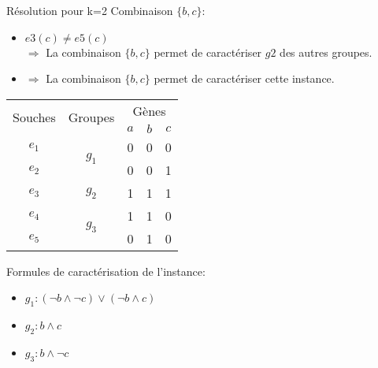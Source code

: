 \begin{overprint}
{			\hspace{0.6cm}
			\begin{minipage}[r]{0.46\linewidth}
				\begin{block}{Résolution pour k=2}
					Combinaison $\{b,c\}$:
					\begin{itemize}
						\item $e3(c) \not = e5(c) $ \\ $\Rightarrow$ La combinaison $\{b,c\}$ permet de caractériser $g2$ des autres groupes.
						\item<31> $\Rightarrow$ La combinaison $\{b,c\}$ permet de caractériser cette instance.
					\end{itemize}
				\end{block}
			\end{minipage}
		}
		{
			\begin{minipage}[l]{0.46\linewidth}
				\begin{center}
					\begin{tabular}{|c||c|c|c|c|}
						\hline
						\multirow{2}{*}{Souches}&\multirow{2}{*}{Groupes}&\multicolumn{3}{c|}{Gènes
						}\\
						&&$a$&$b$&$c$\\
						\hline
						\hline
						$e_1$&\multirow{2}{*}{$g_1$}& 0 & 0 & 0\\
						\cline{1-1} \cline{3-5}
						$e_2$&& 0 & 0 & 1\\
						\hline
						\hline
						$e_3$&$g_2$& 1 &  1 & 1\\
						\hline
						\hline
						$e_4$&\multirow{2}{*}{$g_3$}& 1 & 1 & 0\\
						\cline{1-1} \cline{3-5}
						$e_5$&& 0 & 1 & 0\\
						\hline
					\end{tabular}
				\end{center}
			\end{minipage}
			\hspace{0.4cm}
			\begin{minipage}[r]{0.46\linewidth}
				Formules de caractérisation de l'instance:
				\begin{itemize}
					\item $g_1:(\lnot b \land \lnot c) \lor (\lnot b \land c)$
					\item<33-34> $g_2: b \land c$
					\item<34> $g_3: b \land \lnot c$ 
				\end{itemize}			
			\end{minipage}
		}
	\end{overprint}